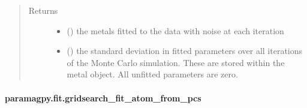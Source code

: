 \documentclass[a4paper,10pt,english,openany,oneside]{sphinxmanual}
\begin{document}
\begin{fulllineitems}
\begin{quote}
\begin{description}
\begin{itemize}
\end{itemize}

\item[{Returns}] \leavevmode
\sphinxAtStartPar
\begin{itemize}
\item {} 
\sphinxAtStartPar
{} () \textendash{} the metals fitted to the data with noise at each iteration

\item {} 
\sphinxAtStartPar
{} () \textendash{} the standard deviation in fitted parameters over all iterations of the
Monte Carlo simulation.
These are stored within the metal object. All unfitted parameters
are zero.

\end{itemize}


\end{description}\end{quote}

\end{fulllineitems}



\paragraph{paramagpy.fit.gridsearch\_fit\_atom\_from\_pcs}
\label{\detokenize{reference/generated/paramagpy.fit.gridsearch_fit_atom_from_pcs:paramagpy-fit-gridsearch-fit-atom-from-pcs}}\label{\detokenize{reference/generated/paramagpy.fit.gridsearch_fit_atom_from_pcs::doc}}
\end{document}
